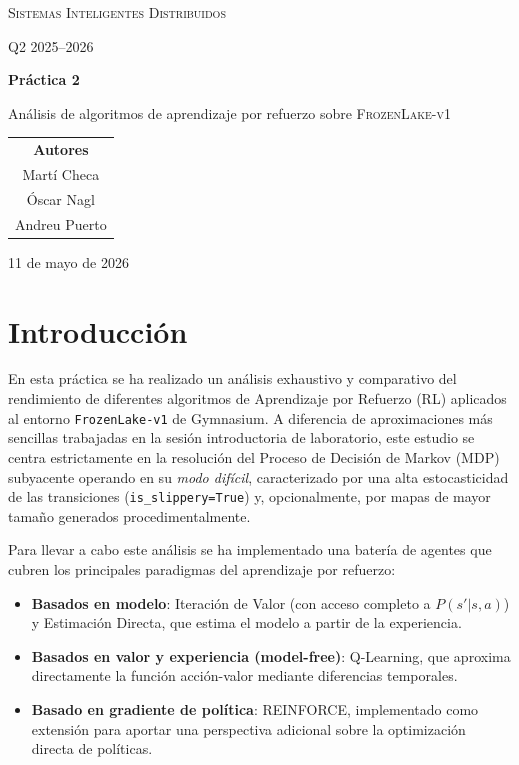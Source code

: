 \documentclass[11pt,a4paper]{article}
\begin{document}
\begin{titlepage}
  \centering
  \vspace*{2cm}
  {\Large \textsc{Sistemas Inteligentes Distribuidos}\par}
  \vspace{0.8cm}
  {\large Q2 2025--2026 \par}
  \vspace{2cm}
  {\Huge\bfseries Práctica 2 \par}
  \vspace{0.6cm}
  {\LARGE Análisis de algoritmos de aprendizaje por refuerzo sobre \textsc{FrozenLake-v1}\par}
  \vspace{2.5cm}
  \begin{tabular}{c}
    \textbf{Autores}\\[0.4em]
    Martí Checa\\
    Óscar Nagl\\
    Andreu Puerto
  \end{tabular}
  \vfill
  {\large 11 de mayo de 2026 \par}
\end{titlepage}

\tableofcontents
\newpage

\section{Introducción}

En esta práctica se ha realizado un análisis exhaustivo y comparativo del rendimiento de diferentes algoritmos de Aprendizaje por Refuerzo (RL) aplicados al entorno \texttt{FrozenLake-v1} de Gymnasium. A diferencia de aproximaciones más sencillas trabajadas en la sesión introductoria de laboratorio, este estudio se centra estrictamente en la resolución del Proceso de Decisión de Markov (MDP) subyacente operando en su \emph{modo difícil}, caracterizado por una alta estocasticidad de las transiciones (\texttt{is\_slippery=True}) y, opcionalmente, por mapas de mayor tamaño generados procedimentalmente.

Para llevar a cabo este análisis se ha implementado una batería de agentes que cubren los principales paradigmas del aprendizaje por refuerzo:
\begin{itemize}
  \item \textbf{Basados en modelo}: Iteración de Valor (con acceso completo a $P(s'|s,a)$) y Estimación Directa, que estima el modelo a partir de la experiencia.
  \item \textbf{Basados en valor y experiencia (model-free)}: Q-Learning, que aproxima directamente la función acción-valor mediante diferencias temporales.
  \item \textbf{Basado en gradiente de política}: REINFORCE, implementado como extensión para aportar una perspectiva adicional sobre la optimización directa de políticas.
\end{itemize}
\end{document}
